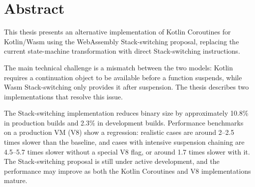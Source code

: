 \chapter*{Abstract}

This thesis presents an alternative implementation of Kotlin Coroutines for Kotlin/Wasm using the
WebAssembly Stack-switching proposal, replacing the current state-machine transformation with direct
Stack-switching instructions.

The main technical challenge is a mismatch between the two models: Kotlin requires a continuation
object to be available before a function suspends, while Wasm Stack-switching only provides it after suspension.
The thesis describes two implementations that resolve this issue.

The Stack-switching implementation reduces binary size by approximately 10.8\% in production builds
and 2.3\% in development builds. Performance benchmarks on a production VM (V8) show a regression: realistic cases
are around 2--2.5 times slower than the baseline, and cases with intensive suspension chaining are
4.5--5.7 times slower without a special V8 flag, or around 1.7 times slower with it. The Stack-switching proposal is still
under active development, and the performance may improve as both the Kotlin Coroutines and V8 implementations mature.
